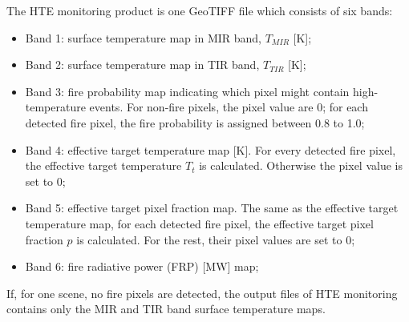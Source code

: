 \noindent The HTE monitoring product is one GeoTIFF file which consists of six bands:
\begin{itemize}
\item Band 1: surface temperature map in MIR band, $T_{MIR}$ [K];
\item Band 2: surface temperature map in TIR band, $T_{TIR}$ [K];
\item Band 3: fire probability map indicating which pixel might contain high-temperature events. For non-fire pixels, the pixel value are 0; for each detected fire pixel, the fire probability is assigned between 0.8 to 1.0;
\item Band 4: effective target temperature map [K]. For every detected fire pixel, the effective target temperature $T_t$ is calculated.  Otherwise the pixel value is set to 0;
\item Band 5: effective target pixel fraction map. The same as the effective target temperature map, for each detected fire pixel, the effective target pixel fraction $p$ is calculated. For the rest, their pixel values are set to 0;
\item Band 6: fire radiative power (FRP) [MW] map;
\end{itemize}

\noindent If, for one scene, no fire pixels are detected, the output files of HTE monitoring contains only the MIR and TIR band surface temperature maps.\\
